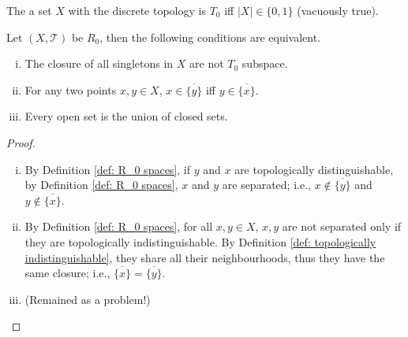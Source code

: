 \begin{example}
	\label{eg: non-T_0 sets}
	The a set $X$ with the discrete topology is $T_0$ iff $|X| \in \{0,1\}$ (vacuously true).
\end{example}










\begin{proposition}
	\label{prop: alternative definitions of R_0 spaces}
	Let $(X, \mathcal T)$ be $R_0$, then the following conditions are equivalent.
	\begin{enumerate}[(i)]
		\item
		The closure of all singletons in $X$ are not $T_0$ subspace.
		
		\item
		For any two points $x,y \in X$, $x \in \overline{ \{y\} }$ iff $y \in \overline{ \{x\} }$.
		
		\item
		Every open set is the union of closed sets.
	\end{enumerate}
	
	\begin{proof}
		\
		\begin{enumerate}[(i)]
			\item
			By Definition \ref{def: R_0 spaces}, if $y$ and $x$ are topologically distinguishable, by Definition \ref{def: R_0 spaces}, $x$ and $y$ are separated; i.e., $x \notin \overline {\{y\}}$ and $y \notin \overline{\{x\}}$.
			
			\item
			By Definition \ref{def: R_0 spaces}, for all $x,y \in X$, $x,y$ are not separated only if they are topologically indistinguishable. By Definition \ref{def: topologically indistinguishable}, they share all their neighbourhoods, thus they have the same closure; i.e., $\overline{\{x\}} = \overline{\{y\}}$.
			
			\item
			(Remained as a problem!)
		\end{enumerate}
	\end{proof}
\end{proposition}







